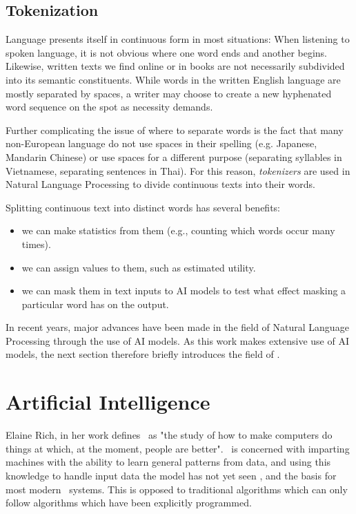 \subsection{Tokenization}
Language presents itself in continuous form in most situations:
When listening to spoken language, it is not obvious where one word ends and another begins.
Likewise, written texts we find online or in books are not necessarily subdivided into its semantic constituents.
While words in the written English language are mostly separated by spaces, a writer may choose to create a new hyphenated word sequence on the spot as necessity demands.

Further complicating the issue of where to separate words is the fact that many non-European language do not use spaces in their spelling (e.g. Japanese, Mandarin Chinese) or use spaces for a different purpose (separating syllables in Vietnamese, separating sentences in Thai).
For this reason, \textit{tokenizers} are used in Natural Language Processing to divide continuous texts into their words. 

Splitting continuous text into distinct words has several benefits:
\begin{itemize}
	\item we can make statistics from them (e.g., counting which words occur many times).
	\item we can assign values to them, such as estimated utility.
	\item we can mask them in text inputs to AI models to test what effect masking a particular word has on the output.
\end{itemize}


In recent years, major advances have been made in the field of Natural Language Processing through the use of AI models.
As this work makes extensive use of AI models, the next section therefore briefly introduces the field of \AI.

\section{Artificial Intelligence}
Elaine Rich, in her work  defines \AI\ as "the study of how to make computers do things at which, at the moment, people are better".
\ML\ is concerned with imparting machines with the ability to learn general patterns from data, and using this knowledge to handle input data the model has not yet seen , and the basis for most modern \AI\ systems.
This is opposed to traditional algorithms which can only follow algorithms which have been explicitly programmed.

